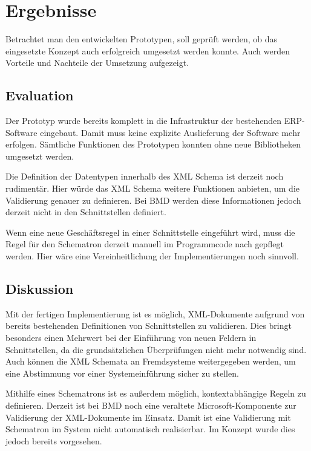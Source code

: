 \chapter{Ergebnisse}
\label{cha:Ergebnisse}
Betrachtet man den entwickelten Prototypen, soll geprüft werden, ob das eingesetzte Konzept auch erfolgreich umgesetzt werden konnte. Auch werden Vorteile und Nachteile der Umsetzung aufgezeigt.

\section{Evaluation}
Der Prototyp wurde bereits komplett in die Infrastruktur der bestehenden ERP-Software eingebaut.
Damit muss keine explizite Auslieferung der Software mehr erfolgen. 
Sämtliche Funktionen des Prototypen konnten ohne neue Bibliotheken umgesetzt werden. 

Die Definition der Datentypen innerhalb des XML Schema ist derzeit noch rudimentär. Hier würde das XML Schema weitere Funktionen anbieten, um die Validierung genauer zu definieren. Bei BMD werden diese Informationen jedoch derzeit nicht in den Schnittstellen definiert.

Wenn eine neue Geschäftsregel in einer Schnittstelle eingeführt wird, muss die Regel für den Schematron derzeit manuell im Programmcode nach gepflegt werden. Hier wäre eine Vereinheitlichung der Implementierungen noch sinnvoll.




\section{Diskussion}
Mit der fertigen Implementierung ist es möglich, XML-Dokumente aufgrund von bereits bestehenden Definitionen von Schnittstellen zu validieren. Dies bringt besonders einen Mehrwert bei der Einführung von neuen Feldern in Schnittstellen, da die grundsätzlichen Überprüfungen nicht mehr notwendig sind. 
Auch können die XML Schemata an Fremdsysteme weitergegeben werden, um eine Abstimmung vor einer Systemeinführung sicher zu stellen.

Mithilfe eines Schematrons ist es außerdem möglich, kontextabhängige Regeln zu definieren. Derzeit ist bei BMD noch eine veraltete Microsoft-Komponente zur Validierung der XML-Dokumente im Einsatz. Damit ist eine Validierung mit Schematron im System nicht automatisch realisierbar. Im Konzept wurde dies jedoch bereits vorgesehen.